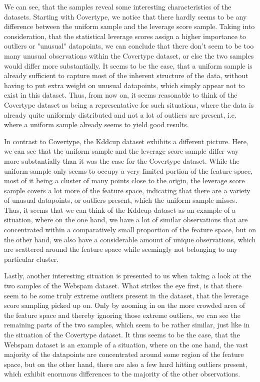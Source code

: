 We can see, that the samples reveal some interesting characteristics
of the datasets. Starting with Covertype, we notice that there
hardly seems to be any difference between the uniform sample and
the leverage score sample. Taking into consideration, that the
statistical leverage scores assign a higher importance to
outliers or "unusual" datapoints, we can conclude that there don't
seem to be too many unusual observations within the Covertype
dataset, or else the two samples would differ more substantially.
It seems to be the case, that a uniform sample is already
sufficient to capture most of the inherent structure of the data,
without having to put extra weight on unusual datapoints, which
simply appear not to exist in this dataset.
Thus, from now on, it seems reasonable to think of the
Covertype dataset as being
a representative for such situations, where the data is
already quite uniformly distributed and not a lot of outliers are
present, i.e. where a uniform sample already seems to
yield good results.

In contrast to Covertype, the Kddcup dataset exhibits a different
picture. Here, we can see that the uniform sample and the leverage
score sample differ way more substantially than it was the case
for the Covertype dataset.
While the uniform sample only seems to occupy a very limited portion
of the feature space, most of it being a cluster of
many points close to the origin,
the leverage score sample covers a lot more
of the feature space,
indicating that there are a variety of unusual datapoints,
or outliers present,
which the uniform sample misses.
Thus, it seems that we can think of the Kddcup dataset as an
example of a situation,
where on the one hand, we have a lot of similar observations that
are concentrated within a comparatively small proportion of
the feature space, but on the other hand, we also have a
considerable amount of unique observations, which are scattered
around the feature space
while seemingly not belonging to any particular cluster.

Lastly, another interesting situation is presented to us when taking
a look at the two samples of the Webspam dataset.
What strikes the eye first, is that there seem to be some truly
extreme outliers present in the dataset, that the leverage score
sampling picked up on. Only by zooming in on the more crowded area
of the feature space and thereby ignoring those extreme outliers,
we can see the remaining parts of the two samples, which seem to
be rather similar, just like in the situation of the Covertype dataset.
It thus seems to be the case, that the Webspam dataset is an example
of a situation, where on the one hand, the vast majority of the
datapoints are concentrated around some region of the feature space,
but on the other hand, there are also a few hard hitting outliers present,
which exhibit enormous differences to the majority of the other
observations.


